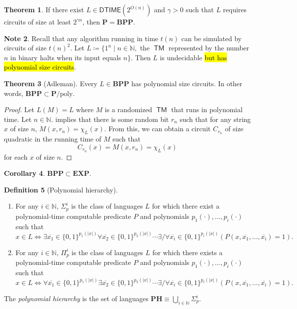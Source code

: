 \documentclass[10pt,letterpaper,cm]{nupset}
\theoremstyle{definition}
\newtheorem{definition}{Definition}[subsection]
\newtheorem{note}[definition]{Note}
\theoremstyle{theorem}
\newtheorem{theorem}[definition]{Theorem}
\newtheorem{corollary}[definition]{Corollary}
\theoremstyle{remark}
\newcommand{\N}{\mathbb N}
\newcommand{\1}{\mathbf{1}}
\newcommand{\0}{\vec 0}
\DeclareMathOperator{\TM}{\mathsf{TM}}
\begin{document}
\begin{theorem}
If there exist $L \in \mathsf{DTIME}(2^{O(n)})$ and $\gamma >0$ such that $L$ requires circuits of size at least $2^{\gamma{n}}$, then $\mathbf{P} = \mathbf{BPP}$.
\end{theorem}

\begin{note}
Recall that any algorithm running in time $t(n)$ can be simulated by circuits of size $t(n)^2$. Let $L \coloneqq \{ 1^n \mid n \in \N,$ the $\TM$ represented by the number $n$ in binary halts when its input equals $n\}$. Then $L$ is undecidable \hl{but has polynomial size circuits}. 
\end{note}

\begin{theorem}[Adleman]
Every $L\in \mathbf{BPP}$ has polynomial size circuits. In other words, $\mathbf{BPP} \subset \mathbf{P}/\mathrm{poly}$.
\end{theorem}
\begin{proof}
Let $L(M)  = L$ where $M$ is a randomized $\TM$ that runs in polynomial time. Let $n\in \N$.  implies that there is some random bit $r_n$ such that for any string $x$ of size $n$, $M(x,r_n) = \chi_L(x)$. From this, we can obtain a circuit $C_{r_n}$ of size quadratic in the running time of $M$ such that $$C_{r_n}(x) = M(x,{r_n}) = \chi_L(x)$$ for each $x$ of size $n$.
\end{proof}

\begin{corollary}
$\mathbf{BPP} \subset \mathbf{EXP}$.
\end{corollary}

\begin{definition}[Polynomial hierarchy]
\begin{enumerate}
\item For any $i \in \N$, $\Sigma_p^i$ is the class of languages $L$ for which there exist a polynomial-time computable predicate $P$ and polynomials $p_1({\cdot}), \ldots, p_i({\cdot})$ such that $$x \in L \iff \exists \overline{x_1}\in \{0,1\}^{p_1(|x|)} \forall \overline{x_2} \in  \{0,1\}^{p_2(|x|)}\cdots \exists /\forall \overline{x_i}\in \{0,1\}^{p_i(|x|)}(P(x, \overline{x_1}, \ldots, \overline{x_i}) =1).$$  
\item For any $i \in \N$, $\Pi_p^i$ is the class of languages $L$ for which there exists a polynomial-time computable predicate $P$ and polynomials $p_1({\cdot}), \ldots, p_i({\cdot})$ such that $$x \in L \iff \forall \overline{x_1}\in \{0,1\}^{p_1(|x|)} \exists \overline{x_2} \in  \{0,1\}^{p_2(|x|)}\cdots \exists /\forall \overline{x_i}\in \{0,1\}^{p_i(|x|)}(P(x, \overline{x_1}, \ldots, \overline{x_i}) =1).$$  
\end{enumerate}
The \textit{polynomial hierarchy} is the set of languages $\mathbf{PH} \equiv \bigcup_{i\in \N}\Sigma_p^i$.
\end{definition}
\end{document}
